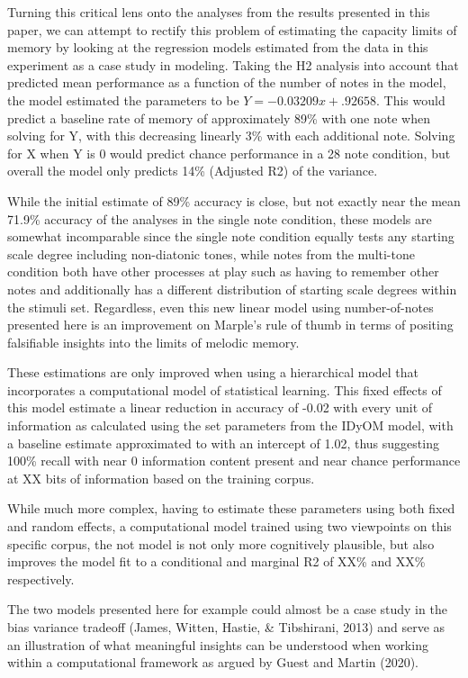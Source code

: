 \documentclass[english,man]{apa6}
\begin{document}
Turning this critical lens onto the analyses from the results presented in this paper, we can attempt to rectify this problem of estimating the capacity limits of memory by looking at the regression models estimated from the data in this experiment as a case study in modeling.
Taking the H2 analysis into account that predicted mean performance as a function of the number of notes in the model, the model estimated the parameters to be \(Y = -0.03209x + .92658\).
This would predict a baseline rate of memory of approximately 89\% with one note when solving for Y, with this decreasing linearly 3\% with each additional note. Solving for X when Y is 0 would predict chance performance in a 28 note condition, but overall the model only predicts 14\% (Adjusted R2) of the variance.

While the initial estimate of 89\% accuracy is close, but not exactly near the mean 71.9\% accuracy of the analyses in the single note condition, these models are somewhat incomparable since the single note condition equally tests any starting scale degree including non-diatonic tones, while notes from the multi-tone condition both have other processes at play such as having to remember other notes and additionally has a different distribution of starting scale degrees within the stimuli set.
Regardless, even this new linear model using number-of-notes presented here is an improvement on Marple's rule of thumb in terms of positing falsifiable insights into the limits of melodic memory.

These estimations are only improved when using a hierarchical model that incorporates a computational model of statistical learning.
This fixed effects of this model estimate a linear reduction in accuracy of -0.02 with every unit of information as calculated using the set parameters from the IDyOM model, with a baseline estimate approximated to with an intercept of 1.02, thus suggesting 100\% recall with near 0 information content present and near chance performance at XX bits of information based on the training corpus.

While much more complex, having to estimate these parameters using both fixed and random effects, a computational model trained using two viewpoints on this specific corpus, the not model is not only more cognitively plausible, but also improves the model fit to a conditional and marginal R2 of XX\% and XX\% respectively.

The two models presented here for example could almost be a case study in the bias variance tradeoff (James, Witten, Hastie, \& Tibshirani, 2013) and serve as an illustration of what meaningful insights can be understood when working within a computational framework as argued by Guest and Martin (2020).
\end{document}

